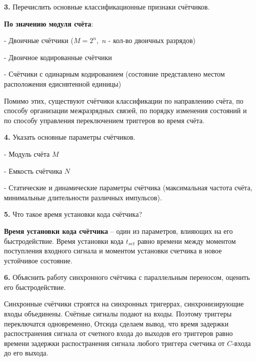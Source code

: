 \documentclass[a4paper,12pt]{article}
\begin{document}
\noindent\textbf{3.} Перечислить основные классификационные признаки счётчиков.\newline

\noindent \textbf{По значению модуля счёта}:\newline

\noindent - Двоичные счётчики ($M = 2^n,$ $n$ - кол-во двоичных разрядов)

\noindent - Двоичное кодированные счётчики

\noindent - Счётчики с одинарным кодированием (состояние представлено местом расположения едиснвтенной единицы)\newline

\noindent Помимо этих, существуют счётчики классификации по направлению счёта, по способу организации межразрядных связей, по порядку изменения состояний и по способу управления переключением триггеров во время счёта.\newline

\noindent\textbf{4.} Указать основные параметры счётчиков.\newline

\noindent- Модуль счёта $M$

\noindent- Емкость счётчика $N$

\noindent- Статические и динамические параметры счётчика (максимальная частота счёта, минимальные длительности различных импульсов).\newline

\noindent\textbf{5.} Что такое время установки кода счётчика?\newline

\noindent \textbf{Время установки кода счётчика} – один из параметров, влияющих на его быстродействие. Время установки кода $t_{set}$ равно времени между моментом поступления входного сигнала и моментом установки счетчика в новое устойчивое состояние.
\newline

\noindent\textbf{6.} Объяснить работу синхронного счётчика с параллельным переносом, оценить его быстродействие.\newline

\noindent Синхронные счётчики строятся на синхронных тригеррах, синхронизирующие входы объединены. Счётные сигналы подают на входы. Поэтому триггеры переключатся одновременно, Отсюда сделаем вывод, что время задержки распостранения сигнала от счетного входа до выходов его триггеров равно времени задержки распостранения сигнала любого триггера счетчика от $C$-входа до его выхода.\newline
\end{document}
